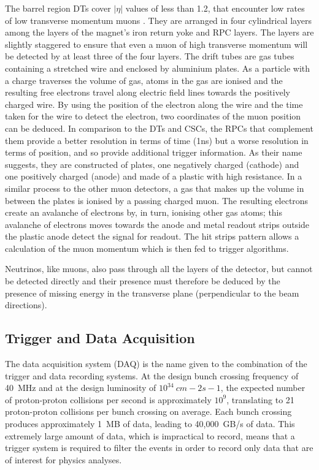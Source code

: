The barrel region DTs cover $|\eta|$ values of less than 1.2, that encounter low rates of low transverse
momentum muons \cite{CMS_TDR1}. They are arranged in four cylindrical layers among the layers of the magnet's
iron return yoke and RPC layers. The layers are slightly staggered to ensure that even a muon of high
transverse momentum will be detected by at least three of the four layers. The drift tubes are gas tubes
containing a stretched wire and enclosed by aluminium plates. As a particle with a charge traverses the volume
of gas, atoms in the gas are ionised and the resulting free electrons travel along electric field lines
towards the positively charged wire. By using the position of the electron along the wire and the time taken
for the wire to detect the electron, two coordinates of the muon position can be deduced.
In comparison to the DTs and CSCs, the RPCs that complement them provide a better resolution in terms of time
(1ns) but a worse resolution in terms of position, and so provide additional trigger information. As their
name suggests, they are constructed of plates, one negatively charged (cathode) and one positively charged
(anode) and made of a plastic with high resistance. In a similar process to the other muon detectors, a gas
that makes up the volume in between the plates is ionised by a passing charged muon. The resulting electrons
create an avalanche of electrons by, in turn, ionising other gas atoms; this avalanche of electrons moves
towards the anode and metal readout strips outside the plastic anode detect the signal for readout. The hit
strips pattern allows a calculation of the muon momentum which is then fed to trigger algorithms.

Neutrinos, like muons, also pass through all the layers of the detector, but cannot be detected directly and
their presence must therefore be deduced by the presence of missing energy in the transverse plane
(perpendicular to the beam directions).

\subsection{Trigger and Data Acquisition}
\label{ss:Trigger}
The data acquisition system (DAQ) is the name given to the combination of the trigger and data recording
systems. At the design bunch crossing frequency of 40~MHz and at the design luminosity of $10^{34}~cm-2s-1$,
the expected number of proton-proton collisions per second is approximately $10^{9}$, translating to 21
proton-proton collisions per bunch crossing on average. Each bunch crossing produces approximately 1~MB of
data, leading to 40,000~GB/s of data. This extremely large amount of data, which is impractical to
record, means that a trigger system is required to filter the events in order to record only data that are of
interest for physics analyses.

